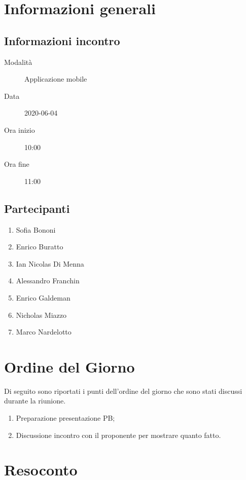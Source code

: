 \documentclass{article}
\begin{document}


\section{Informazioni generali}%
\label{sec:informazioni_generali}

\subsection{Informazioni incontro}%
\label{sub:informazioni_incontro}

\begin{description}
  \item[Modalità] Applicazione mobile 
  \item[Data] 2020-06-04
  \item[Ora inizio] 10:00
  \item[Ora fine] 11:00
\end{description}

\subsection{Partecipanti}%
\label{sub:partecipanti}

\begin{enumerate}
  \item Sofia Bononi
  \item Enrico Buratto
  \item Ian Nicolas Di Menna
  \item Alessandro Franchin
  \item Enrico Galdeman
  \item Nicholas Miazzo
  \item Marco Nardelotto
\end{enumerate}

\section{Ordine del Giorno}%
\label{ordine_del_giorno}
Di seguito sono riportati i punti dell'ordine del giorno che sono stati discussi durante la riunione.
\begin{enumerate}
  \item Preparazione presentazione PB;
  \item Discussione incontro con il proponente per mostrare quanto fatto.
\end{enumerate}

\section{Resoconto}%
\label{resoconto}
\end{document}
